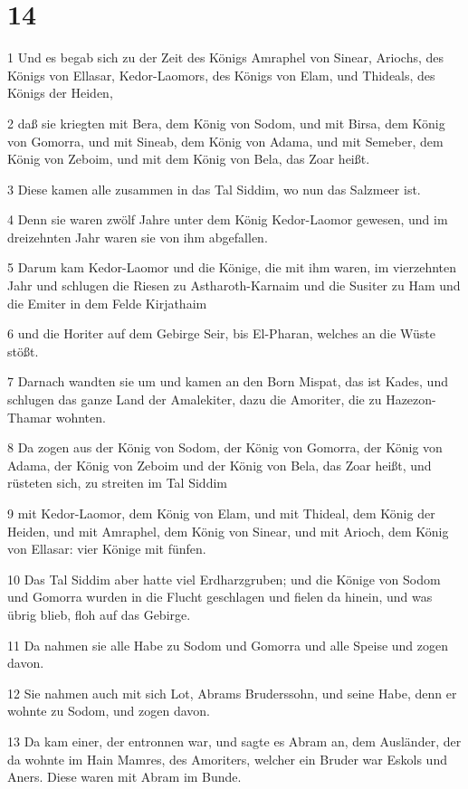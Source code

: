 \chapter{14}

\par 1 Und es begab sich zu der Zeit des Königs Amraphel von Sinear, Ariochs, des Königs von Ellasar, Kedor-Laomors, des Königs von Elam, und Thideals, des Königs der Heiden,
\par 2 daß sie kriegten mit Bera, dem König von Sodom, und mit Birsa, dem König von Gomorra, und mit Sineab, dem König von Adama, und mit Semeber, dem König von Zeboim, und mit dem König von Bela, das Zoar heißt.
\par 3 Diese kamen alle zusammen in das Tal Siddim, wo nun das Salzmeer ist.
\par 4 Denn sie waren zwölf Jahre unter dem König Kedor-Laomor gewesen, und im dreizehnten Jahr waren sie von ihm abgefallen.
\par 5 Darum kam Kedor-Laomor und die Könige, die mit ihm waren, im vierzehnten Jahr und schlugen die Riesen zu Astharoth-Karnaim und die Susiter zu Ham und die Emiter in dem Felde Kirjathaim
\par 6 und die Horiter auf dem Gebirge Seir, bis El-Pharan, welches an die Wüste stößt.
\par 7 Darnach wandten sie um und kamen an den Born Mispat, das ist Kades, und schlugen das ganze Land der Amalekiter, dazu die Amoriter, die zu Hazezon-Thamar wohnten.
\par 8 Da zogen aus der König von Sodom, der König von Gomorra, der König von Adama, der König von Zeboim und der König von Bela, das Zoar heißt, und rüsteten sich, zu streiten im Tal Siddim
\par 9 mit Kedor-Laomor, dem König von Elam, und mit Thideal, dem König der Heiden, und mit Amraphel, dem König von Sinear, und mit Arioch, dem König von Ellasar: vier Könige mit fünfen.
\par 10 Das Tal Siddim aber hatte viel Erdharzgruben; und die Könige von Sodom und Gomorra wurden in die Flucht geschlagen und fielen da hinein, und was übrig blieb, floh auf das Gebirge.
\par 11 Da nahmen sie alle Habe zu Sodom und Gomorra und alle Speise und zogen davon.
\par 12 Sie nahmen auch mit sich Lot, Abrams Bruderssohn, und seine Habe, denn er wohnte zu Sodom, und zogen davon.
\par 13 Da kam einer, der entronnen war, und sagte es Abram an, dem Ausländer, der da wohnte im Hain Mamres, des Amoriters, welcher ein Bruder war Eskols und Aners. Diese waren mit Abram im Bunde.
